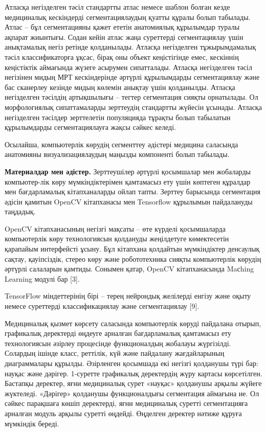 \begin{multicols}{2}
Атласқа негізделген тәсіл стандартты атлас немесе шаблон болған кезде
медициналық кескіндерді сегментациялаудың қуатты құралы болып табылады.
Атлас -- бұл сегментацияны қажет ететін анатомиялық құрылымдар туралы
ақпарат жиынтығы. Содан кейін атлас жаңа суреттерді сегментациялау үшін
анықтамалық негіз ретінде қолданылады. Атласқа негізделген
тұжырымдамалық тәсіл классификаторға ұқсас, бірақ оны объект
кеңістігінде емес, кескіннің кеңістіктік аймағында жүзеге асырумен
сипатталады. Атласқа негізделген тәсіл негізінен мидың МРТ кескіндерінде
әртүрлі құрылымдарды сегментациялау және бас сканерлеу кезінде мидың
көлемін анықтау үшін қолданылды. Атласқа негізделген тәсілдің
артықшылығы -- тегтер сегментация сияқты орнатылады. Ол морфологиялық
сипаттамаларды зерттеудің стандартты жүйесін ұсынады. Атласқа
негізделген тәсілдер зерттелетін популяцияда тұрақты болып табылатын
құрылымдарды сегментациялауға жақсы сәйкес келеді.

Осылайша, компьютерлік көрудің сегменттеу әдістері медицина саласында
анатомияны визуализациялаудың маңызды компоненті болып табылады.

{\bfseries Материалдар мен әдістер.} Зерттеушілер әртүрлі қосымшалар мен
жобаларды компьютер-лік көру мүмкіндіктерімен қамтамасыз ету үшін
көптеген құралдар мен бағдарламалық кітапханаларды ойлап тапты. Зерттеу
барысында сегментация әдісін қамитын OpenCV кітапханасы мен Tensorflow
құрылымын пайдалануды таңдадық.

OpenCV кітапханасының негізгі мақсаты -- өте күрделі қосымшаларда
компьютерлік көру технологиясын қолдануды жеңілдетуге көмектесетін
қарапайым интерфейсті ұсыну. Бұл кітапхана қолдайтын мүмкіндіктер
денсаулық сақтау, қауіпсіздік, стерео көру және робототехника сияқты
компьютерлік көрудің әртүрлі салаларын қамтиды. Сонымен қатар, OpenCV
кітапханасында Maсhing Learning модулі бар {[}3{]}.

TensorFlow міндеттерінің бірі -- терең нейрондық желілерді енгізу және
оқыту немесе суреттерді классификациялау және сегментациялау {[}9{]}.

Медициналық қызмет көрсету саласында компьютерлік көруді пайдалана
отырып, графикалық деректерді өңдеуге арналған бағдарламалық қамтамасыз
ету технологиясын әзірлеу процесінде функционалдың жобалауы жүргізілді.
Солардың ішінде класс, реттілік, күй және пайдалану жағдайларының
диаграммалары құрылды. Әзірленген қосымшада екі негізгі қолданушы түрі
бар: науқас және дәрігер. 1-суретте графикалық деректердің жүру картасы
көрсетілген. Бастапқы деректер, яғни медициналық сурет «науқас»
қолданушы арқылы жүйеге жүктеледі. «Дәрігер» қолданушы функционалдығы
сегментация аймағына ие. Ол сәйкес парақшаға көшіп деректерді, яғни
медициналық суретті сегментацияға арналған модуль арқылы суретті
өңдейді. Өңделген деректер нәтиже құруға мүмкіндік береді.
\end{multicols}

